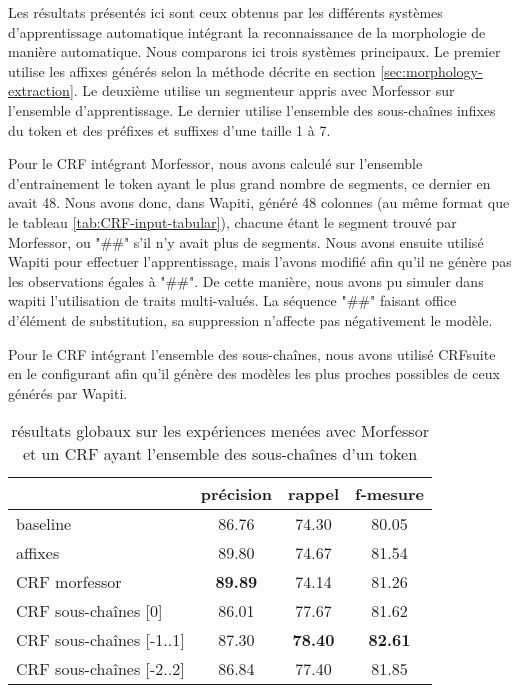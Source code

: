 \documentclass[PhD-Yoann-Dupont.tex]{subfiles}
\begin{document}
Les résultats présentés ici sont ceux obtenus par les différents systèmes d'apprentissage automatique intégrant la reconnaissance de la morphologie de manière automatique. Nous comparons ici trois systèmes principaux. Le premier utilise les affixes générés selon la méthode décrite en section \ref{sec:morphology-extraction}. Le deuxième utilise un segmenteur appris avec Morfessor sur l'ensemble d'apprentissage. Le dernier utilise l'ensemble des sous-chaînes infixes du token et des préfixes et suffixes d'une taille 1 à 7.

Pour le CRF intégrant Morfessor, nous avons calculé sur l'ensemble d'entrainement le token ayant le plus grand nombre de segments, ce dernier en avait 48. Nous avons donc, dans Wapiti, généré 48 colonnes (au même format que le tableau \ref{tab:CRF-input-tabular}), chacune étant le segment trouvé par Morfessor, ou "\#\#" s'il n'y avait plus de segments. Nous avons ensuite utilisé Wapiti pour effectuer l'apprentissage, mais l'avons modifié afin qu'il ne génère pas les observations égales à "\#\#". De cette manière, nous avons pu simuler dans wapiti l'utilisation de traits multi-valués. La séquence "\#\#" faisant office d'élément de substitution, sa suppression n'affecte pas négativement le modèle.

Pour le CRF intégrant l'ensemble des sous-chaînes, nous avons utilisé CRFsuite en le configurant afin qu'il génère des modèles les plus proches possibles de ceux générés par Wapiti.

\begin{table}[ht!]
\centering
\begin{tabular}{|l|ccc|}
\cline{2-4}
\multicolumn{1}{l|}{}   & précision      & rappel         & f-mesure \\
\hline
baseline                & 86.76          & 74.30          & 80.05 \\
affixes                 & 89.80          & 74.67          & 81.54 \\
\hline
CRF morfessor           & \textbf{89.89} & 74.14          & 81.26 \\
\hline
CRF sous-chaînes [0]     & 86.01          & 77.67          & 81.62 \\
CRF sous-chaînes [-1..1] & 87.30          & \textbf{78.40} & \textbf{82.61} \\
CRF sous-chaînes [-2..2] & 86.84          & 77.40          & 81.85 \\
\hline
\end{tabular}
\caption{résultats globaux sur les expériences menées avec Morfessor et un CRF ayant l'ensemble des sous-chaînes d'un token}
\label{tab:ML-morpho-PRF}
\end{table}
\end{document}
